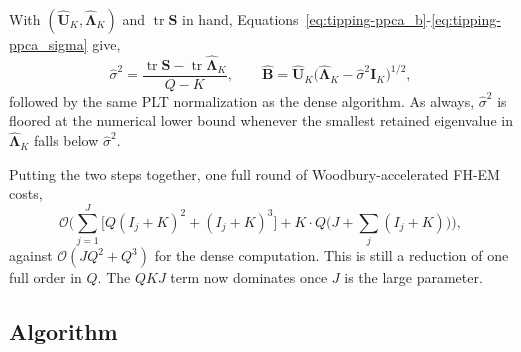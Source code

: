 With $(\hat{\mathbf U}_K,\hat{\bm\Lambda}_K)$ and $\operatorname{tr}\mathbf S$ in hand, Equations~\eqref{eq:tipping-ppca_b}-\eqref{eq:tipping-ppca_sigma} give,
\begin{equation}
    \hat\sigma^2=\frac{\operatorname{tr}\mathbf S-\operatorname{tr}\hat{\bm\Lambda}_K}{Q-K},
    \qquad
    \hat{\mathbf B}=\hat{\mathbf U}_K\big(\hat{\bm\Lambda}_K-\hat\sigma^2\mathbf I_K\big)^{1/2},
    \label{eq:fhem-wb-mstep-final}
\end{equation}
followed by the same PLT normalization as the dense algorithm. As always, $\hat\sigma^2$ is floored at the numerical lower bound whenever the smallest retained eigenvalue in $\hat{\bm\Lambda}_K$ falls below $\hat\sigma^2$.

Putting the two steps together, one full round of Woodbury-accelerated FH-EM costs,
\begin{equation}
    \mathcal O\Big(\sum_{j=1}^J\big[Q(I_j+K)^2+(I_j+K)^3\big]+K\cdot Q\big(J+\textstyle\sum_j(I_j+K)\big)\Big),
    \label{eq:fhem-wb-cost}
\end{equation}
against $\mathcal O(JQ^2+Q^3)$ for the dense computation. This is still a reduction of one full order in $Q$. The $QKJ$ term now dominates once $J$ is the large parameter.

\subsection{Algorithm}

